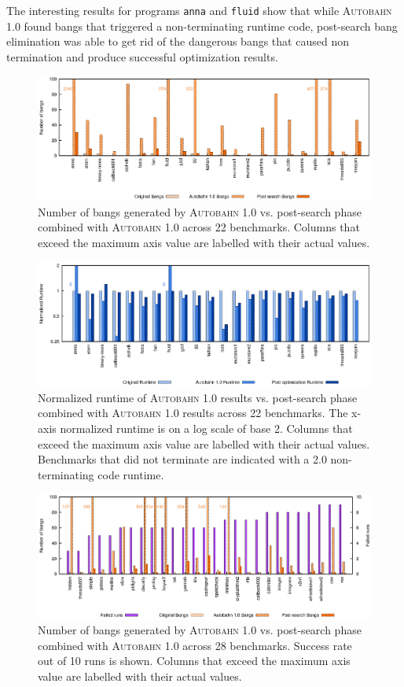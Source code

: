 \documentclass[format=sigplan, review=true]{acmart}
\newcommand{\dangerous}[0]{dangerous}
\newcommand{\Ao}[0]{\textsc{Autobahn 1.0}}
\newcommand{\postopt}[0]{post-search}
\newcommand{\nonterm}[0]{non-terminating}
\begin{document}
The interesting results for programs \texttt{anna} and \texttt{fluid} show that while \Ao{} found bangs that triggered a \nonterm{} runtime code, \postopt{} bang elimination was able to get rid of the \dangerous{} bangs that caused non termination and produce successful optimization results. 

\begin{figure}
\includegraphics[width=\textwidth]{aut-post-bangs}
\caption{Number of bangs generated by \Ao{} vs. \postopt{} phase combined with \Ao{} across 22 benchmarks. Columns that exceed the maximum axis value are labelled with their actual values.}
\end{figure}

\begin{figure}
\includegraphics[width=\textwidth]{aut-post}
\caption{Normalized runtime of \Ao{} results vs. \postopt{} phase combined with \Ao{} results across 22 benchmarks. The x-axis normalized runtime is on a log scale of base 2. Columns that exceed the maximum axis value are labelled with their actual values. Benchmarks that did not terminate are indicated with a 2.0 \nonterm{} code runtime.}
\end{figure}

\begin{figure}
\includegraphics[width=\textwidth]{ap-partial-bangs}
\caption{Number of bangs generated by \Ao{} vs. \postopt{} phase combined with \Ao{} across 28 benchmarks. Success rate out of 10 runs is shown. Columns that exceed the maximum axis value are labelled with their actual values.}
\end{figure}
\end{document}
